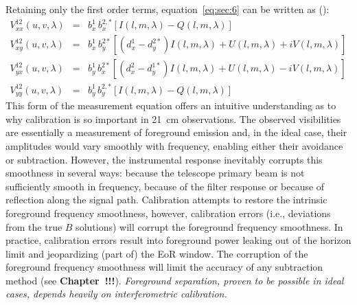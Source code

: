 Retaining only the first order terms, equation~\ref{eq:sec:6} can be written as (\cite{sault96}):
\begin{eqnarray}
V_{xx}^{12} (u,v,\lambda) & = & b_x^1 \, b_x^{2,*} [I (l,m,\lambda) - Q (l,m,\lambda)]\\
V_{xy}^{12} (u,v,\lambda) & = & b_x^1 \, b_y^{2*} [(d_x^1 - d_y^{2*}) I (l,m,\lambda) + U (l,m,\lambda) + iV (l,m,\lambda)]	\\
V_{yx}^{12} (u,v,\lambda) & = & b_y^1 \, b_x^{2*} [(d_x^2 - d_y^{1*}) I (l,m,\lambda) + U (l,m,\lambda) - iV (l,m,\lambda)]	\\
V_{yy}^{12} (u,v,\lambda) & = & b_y^1 \, b_y^{2,*} [I (l,m,\lambda) - Q (l,m,\lambda)]
\label{eq:sec:7}
\end{eqnarray}
This form of the measurement equation offers an intuitive understanding as to why calibration is so important in 21~cm observations. The observed visibilities are essentially a measurement of foreground emission and, in the ideal case, their amplitudes would vary smoothly with frequency, enabling  either their avoidance or subtraction. However, the instrumental response inevitably corrupts this smoothness in several ways: because the telescope primary beam is not sufficiently smooth in frequency, because of the filter response or because of reflection along the signal path. Calibration attempts to restore the intrinsic foreground frequency smoothness, however, calibration errors (i.e., deviations from the true $B$ solutions) will corrupt the foreground frequency smoothness. In practice, calibration errors result into foreground power leaking out of the horizon limit and jeopardizing (part of) the EoR window. The corruption of the foreground frequency smoothness will limit the accuracy of any subtraction method (see {\bf Chapter~!!!}). {\it Foreground separation, proven to be possible in ideal cases, depends heavily on interferometric calibration.}

